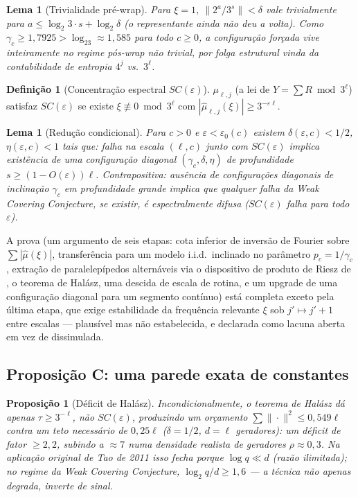 \documentclass[11pt]{article}
\newtheorem{proposition}[theorem]{Proposição}
\newtheorem{lemma}[theorem]{Lema}
\theoremstyle{definition}
\newtheorem{definition}[theorem]{Definição}
\theoremstyle{remark}
\begin{document}
\begin{lemma}[Trivialidade pré-wrap]
Para $\xi=1$, $\|2^a/3^s\|<\delta$ vale trivialmente para
$a\le\log_2 3\cdot s+\log_2\delta$ (o representante ainda não deu a
volta). Como $\gamma_c\ge 1{,}7925>\log_23\approx 1{,}585$ para todo
$c\ge 0$, a configuração forçada vive inteiramente no regime pós-wrap
não trivial, por folga estrutural vinda da contabilidade de entropia
$4^j$ vs.\ $3^\ell$.
\end{lemma}

\begin{definition}[Concentração espectral $SC(\varepsilon)$]
$\mu_{\ell,j}$ (a lei de $Y=\sum R\bmod 3^\ell$) satisfaz
$SC(\varepsilon)$ se existe $\xi\not\equiv 0\bmod 3^\ell$ com
$|\hat\mu_{\ell,j}(\xi)|\ge 3^{-\varepsilon\ell}$.
\end{definition}

\begin{lemma}[Redução condicional]\label{lem:B}
Para $c>0$ e $\varepsilon<\varepsilon_0(c)$ existem
$\delta(\varepsilon,c)<1/2$, $\eta(\varepsilon,c)<1$ tais que: falha
na escala $(\ell,c)$ junto com $SC(\varepsilon)$ implica existência de
uma configuração diagonal $(\gamma_c,\delta,\eta)$ de profundidade
$s\ge(1-O(\varepsilon))\ell$. Contrapositiva: ausência de configurações
diagonais de inclinação $\gamma_c$ em profundidade grande implica que
qualquer falha da Weak Covering Conjecture, se existir, é
espectralmente \emph{difusa} ($SC(\varepsilon)$ falha para todo
$\varepsilon$).
\end{lemma}

A prova (um argumento de seis etapas: cota inferior de inversão de
Fourier sobre $\sum|\hat\mu(\xi)|$, transferência para um modelo
i.i.d.\ inclinado no parâmetro $p_c=1/\gamma_c$, extração de
paralelepípedos alternáveis via o dispositivo de produto de Riesz de
\cite{Tao2011}, o teorema de Halász, uma descida de escala de rotina,
e um upgrade de uma configuração diagonal para um segmento contínuo)
está completa exceto pela última etapa, que exige estabilidade da
frequência relevante $\xi$ sob $j'\mapsto j'+1$ entre escalas ---
plausível mas não estabelecida, e declarada como lacuna aberta em vez
de dissimulada.

\subsection{Proposição C: uma parede exata de constantes}

\begin{proposition}[Déficit de Halász]\label{prop:halasz-deficit}
Incondicionalmente, o teorema de Halász dá apenas $\tau\ge 3^{-\ell}$,
não $SC(\varepsilon)$, produzindo um orçamento
$\sum\|\cdot\|^2\le 0{,}549\ell$ contra um teto necessário de
$0{,}25\ell$ ($\delta=1/2$, $d=\ell$ geradores): um déficit de fator
$\ge 2{,}2$, subindo a $\approx 7$ numa densidade realista de geradores
$\rho\approx 0{,}3$. Na aplicação original de Tao de 2011 isso fecha
porque $\log q \ll d$ (razão ilimitada); no regime da Weak Covering
Conjecture, $\log_2 q/d \ge 1{,}6$ --- a técnica não apenas degrada,
inverte de sinal.
\end{proposition}
\end{document}
